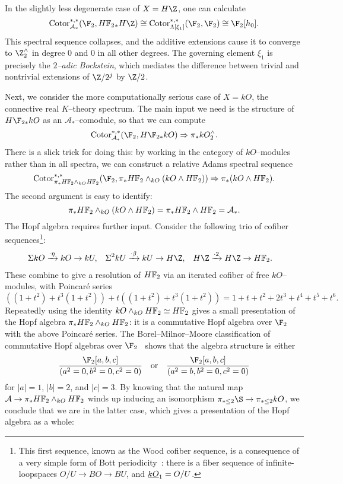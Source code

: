 \begin{example}
In the slightly less degenerate case of \(X = H\Z\), one can calculate \[\Cotor^{*, *}_{\mathcal A_*}(\F_2, \HFtwo_* H\Z) \cong \Cotor^{*, *}_{\Lambda[\xi_1]}(\F_2, \F_2) \cong \F_2[h_0].\]  This spectral sequence collapses, and the additive extensions cause it to converge to \(\Z^\wedge_2\) in degree \(0\) and \(0\) in all other degrees.  The governing element \(\xi_1\) is precisely the \textit{\(2\)--adic Bockstein}, which mediates the difference between trivial and nontrivial extensions of \(\Z/2^j\) by \(\Z/2\).
\end{example}

\begin{example}\label{kOASSExample}
Next, we consider the more computationally serious case of \(X = kO\), the connective real \(K\)--theory spectrum.  The main input we need is the structure of \(H\F_{2*} kO\) as an \(\mathcal A_*\)--comodule, so that we can compute \[\Cotor_{\mathcal A_*}^{*, *}(\F_2, H\F_{2*} kO) \Rightarrow \pi_* kO^\wedge_2.\]  There is a slick trick for doing this: by working in the category of \(kO\)--modules rather than in all spectra, we can construct a relative Adams spectral sequence \[\Cotor_{\pi_* \HFtwo \sm_{kO} \HFtwo}^{*, *}(\F_2, \pi_* \HFtwo \sm_{kO}(kO \sm \HFtwo)) \Rightarrow \pi_*(kO \sm \HFtwo).\]  The second argument is easy to identify: \[\pi_* \HFtwo \sm_{kO}(kO \sm \HFtwo) = \pi_* \HFtwo \sm \HFtwo = \mathcal A_*.\]  The Hopf algebra requires further input.  Consider the following trio of cofiber sequences\footnote{This first sequence, known as the Wood cofiber sequence, is a consequence of a very simple form of Bott periodicity~\cite[Section 5]{Harris}: there is a fiber sequence of infinite-loopspaces \(O/U \to BO \to BU\), and \(\underline{\smash{kO}}_{1} = O/U\).}:
\begin{align*}
\Susp kO & \xrightarrow{\cdot \eta} kO \to kU, &
\Susp^2 kU & \xrightarrow{\cdot \beta} kU \to H\Z, &
H\Z & \xrightarrow{\cdot 2} H\Z \to \HFtwo.
\end{align*}
These combine to give a resolution of \(\HFtwo\) via an iterated cofiber of free \(kO\)--modules, with Poincar\'e series \[((1 + t^2) + t^3(1 + t^2)) + t((1 + t^2) + t^3(1 + t^2)) = 1 + t + t^2 + 2t^3 + t^4 + t^5 + t^6.\]  Repeatedly using the identity \(kO \sm_{kO} \HFtwo \simeq \HFtwo\) gives a small presentation of the Hopf algebra \(\pi_* \HFtwo \sm_{kO} \HFtwo\): it is a commutative Hopf algebra over \(\F_2\) with the above Poincar\'e series.  The Borel--Milnor--Moore classification of commutative Hopf algebras over \(\F_2\)~\cite[Theorem 7.11]{MilnorMoore} shows that the algebra structure is either \[\frac{\F_2[a, b, c]}{(a^2 = 0, b^2 = 0, c^2 = 0)} \quad \text{or} \quad \frac{\F_2[a, b, c]}{(a^2 = b, b^2 = 0, c^2 = 0)}\] for \(|a| = 1\), \(|b| = 2\), and \(|c| = 3\).  By knowing that the natural map \(\mathcal A \to \pi_* \HFtwo \sm_{kO} \HFtwo\) winds up inducing an isomorphism \(\pi_{* \le 2} \S \to \pi_{* \le 2} kO\), we conclude that we are in the latter case, which gives a presentation of the Hopf algebra as a whole:

\end{example}
